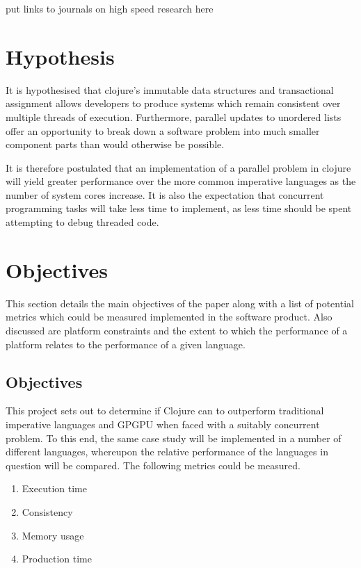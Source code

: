 \documentclass[12pt,a4paper]{article}
\begin{document}
put links to journals on high speed research here


\newpage
\section{Hypothesis}

It is hypothesised that clojure's immutable data structures and transactional assignment allows developers to produce systems which remain consistent over multiple threads of execution. Furthermore, parallel updates to unordered lists offer an opportunity to break down a software problem into much smaller component parts than would otherwise be possible. 

It is therefore postulated that an implementation of a parallel problem in clojure will yield greater performance over the more common imperative languages as the number of system cores increase. It is also the expectation that concurrent programming tasks will take less time to implement, as less time should be spent attempting to debug threaded code. 

\newpage
\section{Objectives}

This section details the main objectives of the paper along with a list of potential metrics which could be measured implemented in the software product. Also discussed are platform constraints and the extent to which the performance of a platform relates to the performance of a given language.


\subsection{Objectives}

This project sets out to determine if Clojure can to outperform traditional imperative languages and GPGPU when faced with a suitably concurrent problem. To this end, the same case study will be implemented in a number of different languages, whereupon the relative performance of the languages in question will be compared. The following metrics could be measured.

\begin{enumerate} \itemsep0pt
    \item Execution time
    \item Consistency
    \item Memory usage
    \item Production time
\end{enumerate}
\end{document}
